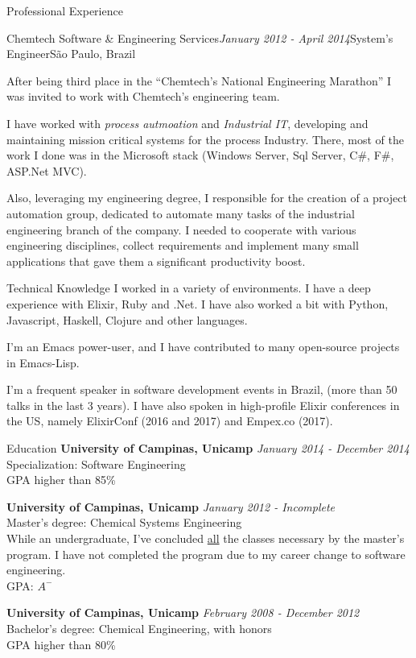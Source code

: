 \documentclass{resume} %
\begin{document}
\begin{rSection}{Professional Experience}
  \begin{rSubsection}{Chemtech Software \& Engineering Services}{\em January 2012 -
      April 2014}{System's Engineer}{São Paulo, Brazil}

  \item After being third place in the ``Chemtech's National Engineering
    Marathon'' I was invited to work with Chemtech's engineering team.

  \item I have worked with {\em process autmoation} and {\em Industrial IT},
    developing and maintaining mission critical systems for the process
    Industry. There, most of the work I done was in the Microsoft stack (Windows
    Server, Sql Server, C\#, F\#, ASP.Net MVC).

  \item Also, leveraging my engineering degree, I responsible for the creation
    of a project automation group, dedicated to automate many tasks of the
    industrial engineering branch of the company. I needed to cooperate with
    various engineering disciplines, collect requirements and implement many
    small applications that gave them a significant productivity boost.
  \end{rSubsection}
\end{rSection}

\begin{rSection}{Technical Knowledge}
  I worked in a variety of environments. I have a deep experience with Elixir,
  Ruby and .Net. I have also worked a bit with Python, Javascript, Haskell,
  Clojure and other languages.

  I'm an Emacs power-user, and I have contributed to many open-source
  projects in Emacs-Lisp.

  I'm a frequent speaker in software development events in Brazil, (more than 50
  talks in the last 3 years). I have also spoken in high-profile Elixir
  conferences in the US, namely ElixirConf (2016 and 2017) and Empex.co (2017).
\end{rSection}

\begin{rSection}{Education}
  {\bf University of Campinas, Unicamp} \hfill {\em January 2014 - December 2014} \\
  Specialization: Software Engineering \\
  GPA higher than 85\%

  {\bf University of Campinas, Unicamp} \hfill {\em January 2012 - Incomplete} \\
  Master's degree: Chemical Systems Engineering \\
  While an undergraduate, I've concluded \underline{all} the classes necessary by
  the master's program. I have not completed the program due to my career change
  to software engineering. \\
  GPA: $A^-$

  {\bf University of Campinas, Unicamp} \hfill {\em February 2008 - December 2012} \\
  Bachelor's degree: Chemical Engineering, with honors \\
  GPA higher than 80\%
\end{rSection}
\end{document}
